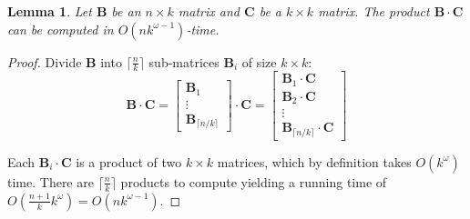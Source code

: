 \documentclass{article}
\newtheorem{lemma}[theorem]{Lemma}
\newcommand{\matsize}[2]{#1\times #2}
\newcommand{\matexp}{\omega}
\newcommand{\mat}[1]{\mathbf{#1}}
\begin{document}
\begin{lemma}\label{lem:block_multiplication}
	Let $\mat{B}$ be an $\matsize{n}{k}$ matrix and $\mat{C}$ be a $\matsize{k}{k}$  matrix. The product $\mat{B}\cdot \mat{C}$ can be computed in $O(nk^{\matexp-1})$-time.
\end{lemma}
\begin{proof}
	Divide $\mat{B}$ into $\lceil \frac{n}{k}\rceil$ sub-matrices $\mat{B}_i$ of size $\matsize{k}{k}$:
 \[ \mat{B}\cdot \mat{C} = \begin{bmatrix} 
\mat{B}_1 \\ \vdots \\ \mat{B}_{\lceil n/k \rceil} 
 \end{bmatrix} \cdot \mat{C} = \begin{bmatrix} 
 \mat{B}_1\cdot \mat{C} \\ \mat{B}_2\cdot \mat{C} \\ \vdots \\ \mat{B}_{\lceil n/k \rceil} \cdot \mat{C}
 \end{bmatrix}  \]
	
	Each $\mat{B}_i \cdot \mat{C}$ is a product of two $\matsize{k}{k}$ matrices, which by definition takes $O(k^{\matexp})$ time.  There are $\lceil\frac{n}{k}\rceil$ products to compute yielding a running time of $O\left(\frac{n+1}{k} k^\matexp\right ) = O(n k^{\matexp-1})$.
\end{proof}
\end{document}
